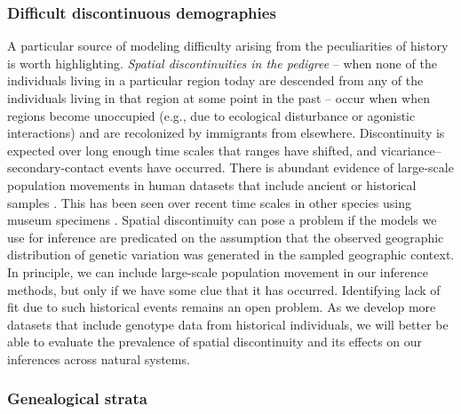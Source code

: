 \documentclass{ar-1col}
\newcommand{\g}[1]{{\color{blue}{#1}}}
\renewcommand{\emph}[1]{{\textit{#1}}}
\begin{document}
{%
\subsubsection{Difficult discontinuous demographies}

\g{what to do here re: brad's comment?  Go back to original?  Bring back ``winter of our discontinuity"?}
A particular source of modeling difficulty arising from the peculiarities of history is worth highlighting.
\emph{Spatial discontinuities in the pedigree} --
when none of the individuals living in a particular region today
are descended from any of the individuals living in that region 
at some point in the past --
occur when when regions become unoccupied
(e.g., due to ecological disturbance or agonistic interactions) 
and are recolonized by immigrants from elsewhere. 
Discontinuity is expected over long enough time scales that ranges have shifted,
and vicariance--secondary-contact events have occurred.
There is abundant evidence of large-scale population movements
in human datasets that include ancient or historical samples 
\citep{skoglund2014investigating, PickrellReich2014, lazaridis_ancient_2014, haak2015massive, joseph2018inference}.
This has been seen over recent time scales in other species using museum specimens \citep{bi2013unlocking}.
Spatial discontinuity can pose a problem 
if the models we use for inference are predicated on the assumption that 
the observed geographic distribution of genetic variation 
was generated in the sampled geographic context.
In principle, we can include large-scale population movement in our inference methods,
but only if we have some clue that it has occurred.
Identifying lack of fit due to such historical events
remains an open problem.
As we develop more datasets that include genotype data from historical individuals, 
we will better be able to evaluate the prevalence of spatial discontinuity 
and its effects on our inferences across natural systems. 

\subsubsection{Genealogical strata}

}
\end{document}

